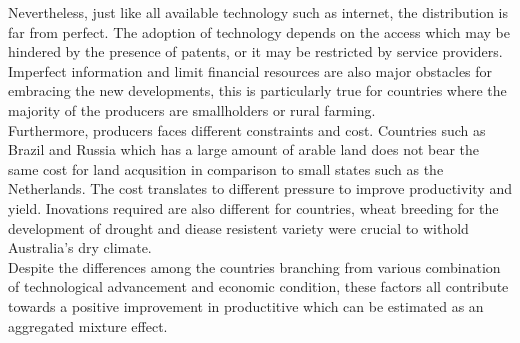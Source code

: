 \documentclass[nojss]{jss}\usepackage[]{graphicx}\usepackage[]{color}
\begin{document}
Nevertheless, just like all available technology such as internet, the
distribution is far from perfect. The adoption of technology depends
on the access which may be hindered by the presence of patents, or it
may be restricted by service providers. Imperfect information and
limit financial resources are also major obstacles for embracing the
new developments, this is particularly true for countries where the
majority of the producers are smallholders or rural farming.\\

Furthermore, producers faces different constraints and cost. Countries
such as Brazil and Russia which has a large amount of arable land does
not bear the same cost for land acqusition in comparison to small
states such as the Netherlands. The cost translates to different
pressure to improve productivity and yield. Inovations required are
also different for countries, wheat breeding for the development of
drought and diease resistent variety were crucial to withold
Australia's dry climate.  \\


Despite the differences among the countries branching from various
combination of technological advancement and economic condition, these
factors all contribute towards a positive improvement in productitive
which can be estimated as an aggregated mixture effect.\\
\end{document}
